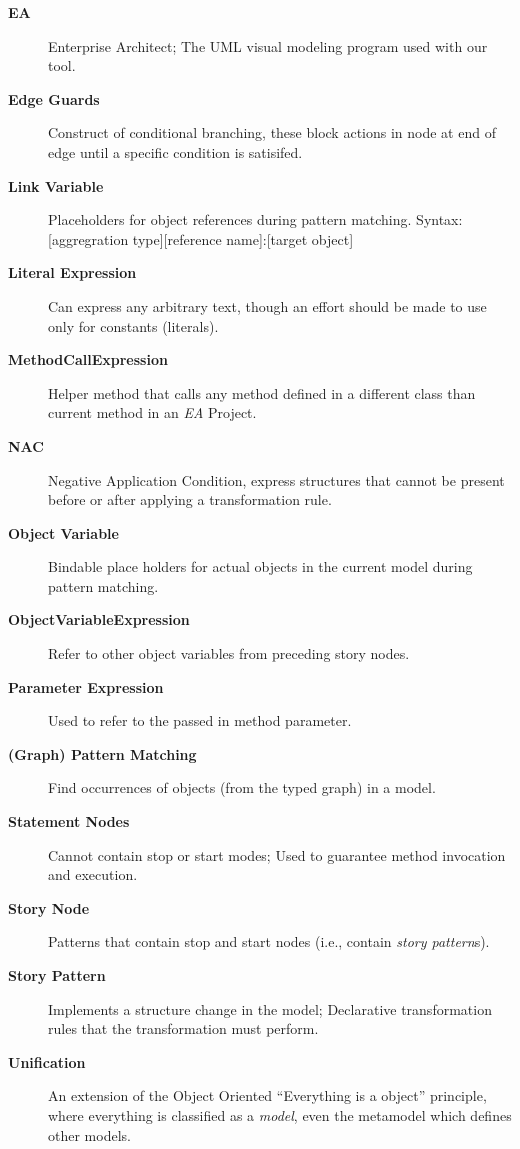 \begin{description}
\item[\bf EA]
Enterprise Architect; The UML visual modeling program used with our tool.

\item[\bf Edge Guards]
Construct of conditional branching, these block actions in node at end of edge until a specific condition is satisifed.

\item[\bf Link Variable]
Placeholders for object references during pattern matching. Syntax: [aggregration type][reference name]:[target object]

\item[\bf Literal Expression]
Can express any arbitrary text, though an effort should be made to use only for constants (literals).

\item[\bf MethodCallExpression]
Helper method that calls any method defined in a different class than current method in an \emph{EA} Project.

\item[\bf NAC]
Negative Application Condition, express structures that cannot be present before or after applying a transformation rule.
	
\item[\bf Object Variable]
Bindable place holders for actual objects in the current model during pattern matching.

\item[\bf ObjectVariableExpression]
Refer to other object variables from preceding story nodes.

\item[\bf Parameter Expression]
Used to refer to the passed in method parameter.

\item[\bf (Graph) Pattern Matching]
Find occurrences of objects (from the typed graph) in a model.

\item[\bf Statement Nodes]
Cannot contain stop or start modes; Used to guarantee method invocation and execution.

\item[\bf Story Node]
Patterns that contain stop and start nodes (i.e., contain \emph{story pattern}s).

\item[\bf Story Pattern]
Implements a structure change in the model; Declarative transformation rules that the transformation must perform.

\item[\bf Unification]
An extension of the Object Oriented ``Everything is a object'' principle, where everything is classified as a \emph{model}, even the metamodel which defines
other models.

\end{description}
